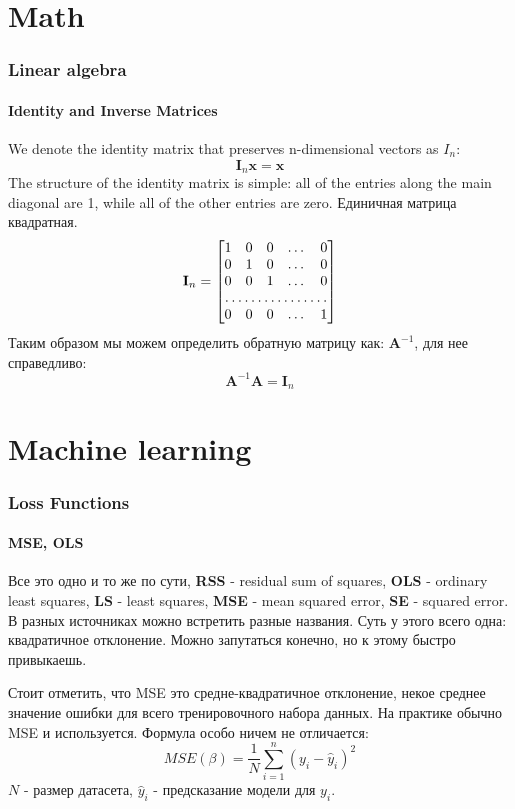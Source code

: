 \documentclass{article}
\begin{document}
\part{Math}
\section{Linear algebra}
\subsection{Identity and Inverse Matrices}
We denote the identity matrix that preserves n-dimensional vectors as $I_n$:$$\mathbf{I}_n\mathbf{x}=\mathbf{x}$$The structure of the identity matrix is simple: all of the entries along the main
diagonal are 1, while all of the other entries are zero.
Единичная матрица квадратная.
\[
\mathbf{I}_n=
\begin{bmatrix}
    1       & 0 & 0 & \dots & 0 \\
    0       & 1 & 0 & \dots & 0 \\
    0       & 0 & 1 & \dots & 0 \\
    \hdotsfor{5} \\
    0       & 0 & 0 & \dots & 1
\end{bmatrix}
\]
Таким образом мы можем определить обратную матрицу как: $\mathbf{A}^{-1}$, для нее справедливо:$$\mathbf{A}^{-1}\mathbf{A} = \mathbf{I}_n$$
\label{Identity_and_Inverse_Matrices}
\part{Machine learning}
\section{Loss Functions}
\subsection{MSE, OLS}
Все это одно и то же по сути, \textbf{RSS} - residual sum of squares, \textbf{OLS} - ordinary least squares, \textbf{LS} - least  squares, \textbf{MSE} - mean squared error, \textbf{SE} - squared error. В разных источниках можно встретить разные названия. Суть у этого всего одна: квадратичное отклонение. Можно запутаться конечно, но к этому быстро привыкаешь.

Стоит отметить, что MSE это средне-квадратичное отклонение, некое среднее значение ошибки для всего тренировочного набора данных. На практике обычно MSE и используется. Формула особо ничем не отличается:$$MSE(\beta)=\frac{1}{N}\sum_{i=1}^n(y_i-\hat{y}_i)^2$$$N$ - размер датасета, $\hat{y}_i$ - предсказание модели для $y_i$.
\label{loss:LS}
\end{document}
